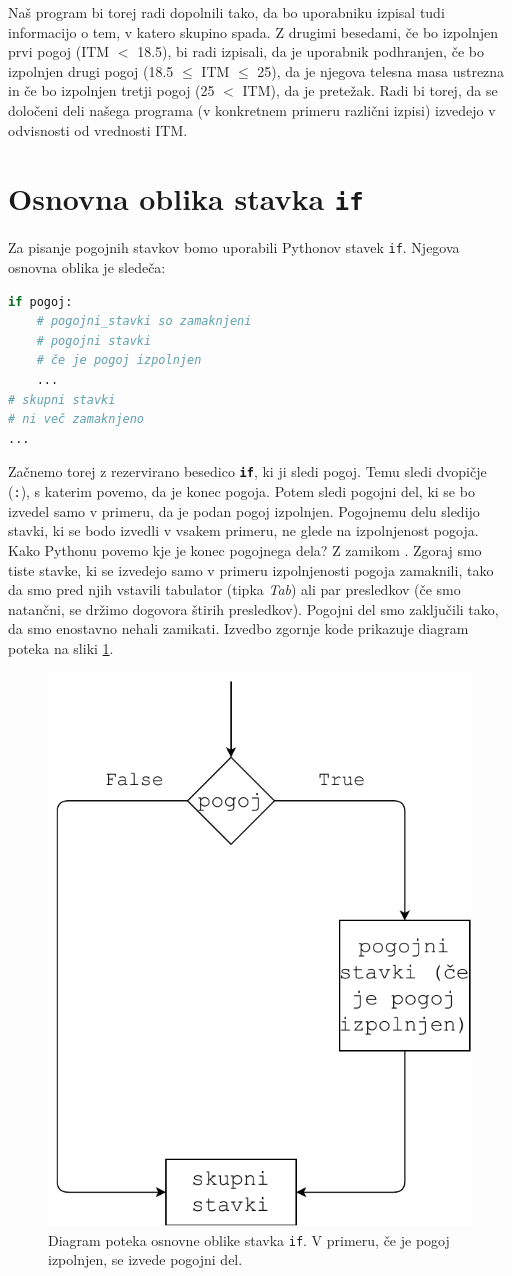 \bigskip

Naš program bi torej radi dopolnili tako, da bo uporabniku izpisal tudi informacijo o tem, v katero skupino spada. Z drugimi besedami, če bo izpolnjen prvi pogoj (ITM $<$ 18.5), bi radi izpisali, da je uporabnik podhranjen, če bo izpolnjen drugi pogoj (18.5 $\leq$ ITM $\leq$ 25), da je njegova telesna masa ustrezna in če bo izpolnjen tretji pogoj (25 $<$ ITM), da je pretežak. Radi bi torej, da se določeni deli našega programa (v konkretnem primeru različni izpisi) izvedejo v odvisnosti od vrednosti ITM. 

\section{Osnovna oblika stavka \texttt{if}}

Za pisanje pogojnih stavkov bomo uporabili Pythonov stavek \texttt{if}. Njegova osnovna oblika je sledeča:
\begin{lstlisting}[language=Python]
if pogoj:
    # pogojni_stavki so zamaknjeni
    # pogojni stavki
    # če je pogoj izpolnjen
    ...
# skupni stavki
# ni več zamaknjeno
...
\end{lstlisting}
Začnemo torej z rezervirano besedico \textbf{\texttt{if}}, ki ji sledi pogoj. Temu sledi dvopičje (\texttt{:}), s katerim povemo, da je konec pogoja. Potem sledi pogojni del, ki se bo izvedel samo v primeru, da je podan pogoj izpolnjen. Pogojnemu delu sledijo stavki, ki se bodo izvedli v vsakem primeru, ne glede na izpolnjenost pogoja. Kako Pythonu povemo kje je konec pogojnega dela? Z zamikom . Zgoraj smo tiste stavke, ki se izvedejo samo v primeru izpolnjenosti pogoja zamaknili, tako da smo pred njih vstavili tabulator (tipka \emph{Tab}) ali par presledkov (če smo natančni, se držimo dogovora štirih presledkov). Pogojni del smo zaključili tako, da smo enostavno nehali zamikati. Izvedbo zgornje kode prikazuje diagram poteka na sliki \ref{img:if1}.
\begin{figure}
    \centering
    \includegraphics[width=0.5\linewidth]{img/if1.pdf}
    \caption{Diagram poteka osnovne oblike stavka \texttt{if}. V primeru, če je pogoj izpolnjen, se izvede pogojni del.}
    \label{img:if1}
\end{figure}

